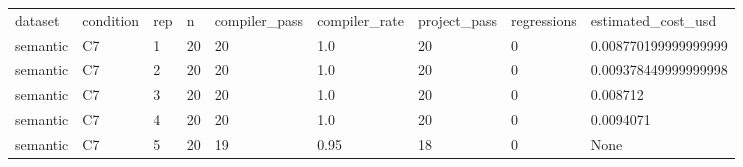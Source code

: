 \begin{tabular}{lllllllll}
dataset & condition & rep & n & compiler\_pass & compiler\_rate & project\_pass & regressions & estimated\_cost\_usd \\
semantic & C7 & 1 & 20 & 20 & 1.0 & 20 & 0 & 0.008770199999999999 \\
semantic & C7 & 2 & 20 & 20 & 1.0 & 20 & 0 & 0.009378449999999998 \\
semantic & C7 & 3 & 20 & 20 & 1.0 & 20 & 0 & 0.008712 \\
semantic & C7 & 4 & 20 & 20 & 1.0 & 20 & 0 & 0.0094071 \\
semantic & C7 & 5 & 20 & 19 & 0.95 & 18 & 0 & None \\
\end{tabular}